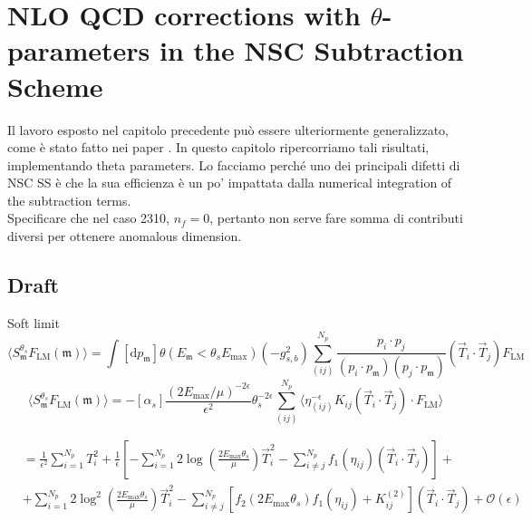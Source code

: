 \documentclass[a4paper, 12pt]{book}
\newcommand{\um}{\mathfrak{m}}
\begin{document}
 

\clearpage

\chapter{NLO QCD corrections with $\theta$-parameters in the NSC Subtraction Scheme}
\label{NSC-SS-parameters}

Il lavoro esposto nel capitolo precedente può essere ulteriormente generalizzato, come è stato fatto nei paper \cite{Devoto:2023rpv,Devoto:2025kin}. In questo capitolo ripercorriamo tali risultati, implementando theta parameters. Lo facciamo perché uno dei principali difetti di NSC SS è che la sua efficienza è un po' impattata dalla numerical integration of the subtraction terms. \\

Specificare che nel caso 2310, $n_f=0$, pertanto non serve fare somma di contributi diversi per ottenere anomalous dimension.

\section{Draft}
Soft limit
\begin{equation}
  \langle S_\um^{\theta_s} F_\mathrm{LM}(\um) \rangle = \int [\mathrm{d}p_\um] \theta(E_\um < \theta_s E_{\mathrm{max}}) (-g^2_{s,b}) \sum _{(ij)}^{N_p} \frac{p_i \cdot p_j}{(p_i \cdot p_\um)(p_j \cdot p_\um)} (\vec{T}_i \cdot \vec{T}_j) F_\mathrm{LM}
\end{equation}
\begin{equation}
  \langle S_\um^{\theta_s} F_\mathrm{LM}(\um) \rangle = - [\alpha_s] \frac{\left(2E_{\mathrm{max}}/\mu\right)^{-2\epsilon}}{\epsilon^2} \theta_s^{-2\epsilon}\sum_{(ij)}^{N_p} \langle \eta_{(ij)}^{-\epsilon} K_{ij} (\vec{T}_i \cdot \vec{T}_j) \cdot F_\mathrm{LM} \rangle
\end{equation}

\begin{equation}
  \begin{split}
  & = \frac{1}{\epsilon^2} \sum_{i=1}^{N_p} T_i^2 + \frac{1}{\epsilon}\left[-\sum_{i=1}^{N_p} 2 \log{\left(\frac{2 E_{\mathrm{max}}\theta_s}{\mu} \right)} \vec{T}_i^2 - \sum_{i\neq j}^{N_p} f_1(\eta_{ij}) (\vec{T}_i \cdot \vec{T}_j) \right] + \\
  &  + \sum_{i=1}^{N_p} 2 \log^2{\left(\frac{2 E_{\mathrm{max}}\theta_s}{\mu} \right)}\vec{T}_i^2 - \sum_{i\neq j}^{N_p} \left[ f_2 \left(2 E_{\mathrm{max}}\theta_s\right) f_1(\eta_{ij}) + K_{ij}^{(2)}\right] (\vec{T}_i \cdot \vec{T}_j) + \mathcal{O}(\epsilon)
  \end{split}
\end{equation}
\end{document}
